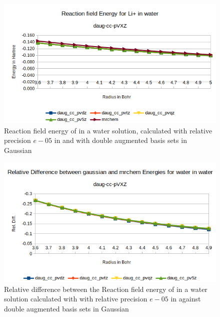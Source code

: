 \documentclass[../master_thesis.tex]{subfiles}
\begin{document}
\begin{figure}[!htb]
  \centering
    \includegraphics[width=0.75\linewidth]{img/Erdauglip.png}
  \caption[Reaction field energy of ]{Reaction field energy of  in a water solution, calculated with relative precision $e-05$ in \mrchem  and with double augmented basis sets in Gaussian}
  \label{fig:lipEnergyplotsdaug}
\end{figure}



\begin{figure}[!htb]
  \centering
    \includegraphics[width=\linewidth]{img/watdaugreldiff.png}
  \caption[Relative difference of  against Gaussian double augmented results]{Relative difference between the Reaction field energy of  in a water solution calculated with with relative precision $e-05$ in \mrchem
   against double augmented basis sets in Gaussian}
  \label{fig:watreldiffdaug}
\end{figure}
\end{document}
